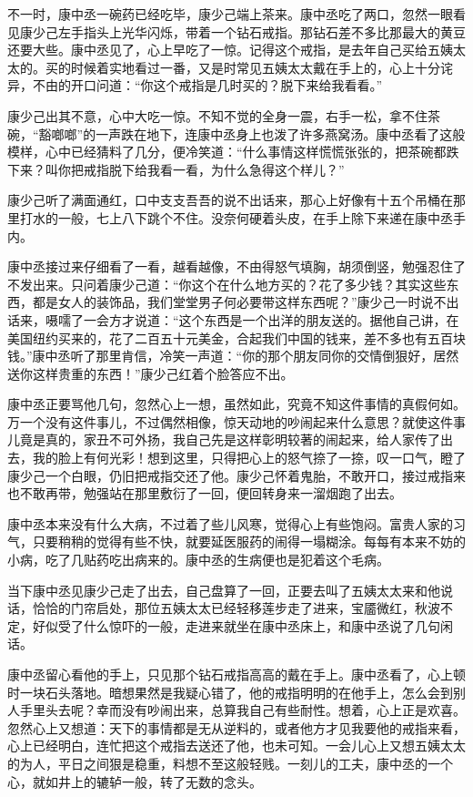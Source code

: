 \documentclass[12pt,UTF8]{ctexbook}
\begin{document}
{{{不一时，康中丞一碗药已经吃毕，康少己端上茶来。康中丞吃了两口，忽然一眼看见康少己左手指头上光华闪烁，带着一个钻石戒指。那钻石差不多比那最大的黄豆还要大些。康中丞见了，心上早吃了一惊。记得这个戒指，是去年自己买给五姨太太的。买的时候着实地看过一番，又是时常见五姨太太戴在手上的，心上十分诧异，不由的开口问道：“你这个戒指是几时买的？脱下来给我看看。”

康少己出其不意，心中大吃一惊。不知不觉的全身一震，右手一松，拿不住茶碗，“豁啷啷”的一声跌在地下，连康中丞身上也泼了许多燕窝汤。康中丞看了这般模样，心中已经猜料了几分，便冷笑道：“什么事情这样慌慌张张的，把茶碗都跌下来？叫你把戒指脱下给我看一看，为什么急得这个样儿？”

康少己听了满面通红，口中支支吾吾的说不出话来，那心上好像有十五个吊桶在那里打水的一般，七上八下跳个不住。没奈何硬着头皮，在手上除下来递在康中丞手内。

康中丞接过来仔细看了一看，越看越像，不由得怒气填胸，胡须倒竖，勉强忍住了不发出来。只问着康少己道：“你这个在什么地方买的？花了多少钱？其实这些东西，都是女人的装饰品，我们堂堂男子何必要带这样东西呢？”康少己一时说不出话来，嗫嚅了一会方才说道：“这个东西是一个出洋的朋友送的。据他自己讲，在美国纽约买来的，花了二百五十元美金，合起我们中国的钱来，差不多也有五百块钱。”康中丞听了那里肯信，冷笑一声道：“你的那个朋友同你的交情倒狠好，居然送你这样贵重的东西！”康少己红着个脸答应不出。

康中丞正要骂他几句，忽然心上一想，虽然如此，究竟不知这件事情的真假何如。万一个没有这件事儿，不过偶然相像，惊天动地的吵闹起来什么意思？就使这件事儿竟是真的，家丑不可外扬，我自己先是这样彰明较著的闹起来，给人家传了出去，我的脸上有何光彩！想到这里，只得把心上的怒气捺了一捺，叹一口气，瞪了康少己一个白眼，仍旧把戒指交还了他。康少己怀着鬼胎，不敢开口，接过戒指来也不敢再带，勉强站在那里敷衍了一回，便回转身来一溜烟跑了出去。

康中丞本来没有什么大病，不过着了些儿风寒，觉得心上有些饱闷。富贵人家的习气，只要稍稍的觉得有些不快，就要延医服药的闹得一塌糊涂。每每有本来不妨的小病，吃了几贴药吃出病来的。康中丞的生病便也是犯着这个毛病。

当下康中丞见康少己走了出去，自己盘算了一回，正要去叫了五姨太太来和他说话，恰恰的门帘启处，那位五姨太太已经轻移莲步走了进来，宝靥微红，秋波不定，好似受了什么惊吓的一般，走进来就坐在康中丞床上，和康中丞说了几句闲话。

康中丞留心看他的手上，只见那个钻石戒指高高的戴在手上。康中丞看了，心上顿时一块石头落地。暗想果然是我疑心错了，他的戒指明明的在他手上，怎么会到别人手里头去呢？幸而没有吵闹出来，总算我自己有些耐性。想着，心上正是欢喜。忽然心上又想道：天下的事情都是无从逆料的，或者他方才见我要他的戒指来看，心上已经明白，连忙把这个戒指去送还了他，也未可知。一会儿心上又想五姨太太的为人，平日之间狠是稳重，料想不至这般轻贱。一刻儿的工夫，康中丞的一个心，就如井上的辘轳一般，转了无数的念头。

}}}
\end{document}
